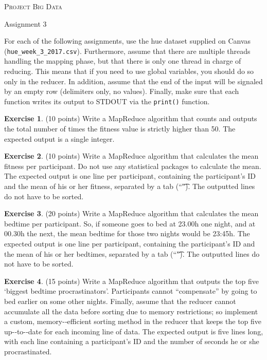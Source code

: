 \documentclass[a4paper]{report}
\theoremstyle{definition}
\newtheorem{exercise}{Exercise}
\newcommand{\blankline}{\par\vspace{5mm}}
\begin{document}
\begin{center}
    \textsc{\Large Project Big Data}
    \blankline
    
    {\large Assignment 3}
\end{center}

For each of the following assignments, use the hue dataset supplied on
Canvas (\texttt{\small hue\_week\_3\_2017.csv}). Furthermore, assume
that there are multiple threads handling the mapping phase, but that
there is only one thread in charge of reducing. This means that if you
need to use global variables, you should do so only in the reducer. In
addition, assume that the end of the input will be signaled by an empty
row (delimiters only, no values). Finally, make sure that each function
writes its output to STDOUT via the \texttt{\small print()} function.

\begin{exercise}
(10 points) Write a MapReduce algorithm that counts and outputs the
total number of times the fitness value is strictly higher than 50. The
expected output is a single integer.
\end{exercise}

\begin{exercise}
(10 points) Write a MapReduce algorithm that calculates the mean fitness
per participant. Do not use any statistical packages to calculate
the mean. The expected output is one line per participant, containing
the participant’s ID and the mean of his or her fitness, separated by
a tab (“\t”). The outputted lines do not have to be sorted.
\end{exercise}

\begin{exercise}
(20 points) Write a MapReduce algorithm that calculates the mean bedtime
per participant. So, if someone goes to bed at 23.00h one night,
and at 00.30h the next, the mean bedtime for those two nights would
be 23:45h. The expected output is one line per participant, containing
the participant’s ID and the mean of his or her bedtimes, separated
by a tab (“\t”). The outputted lines do not have to be sorted.
\end{exercise}

\begin{exercise}
(15 points) Write a MapReduce algorithm that outputs the top
five ‘biggest bedtime procrastinators’. Participants cannot
“compensate” by going to bed earlier on some other nights. Finally,
assume that the reducer cannot accumulate all the data before sorting
due to memory restrictions; so implement a custom, memory-­‐efficient
sorting method in the reducer that keeps the top five up-­‐to-­‐date
for each incoming line of data. The expected output is five lines long,
with each line containing a participant’s ID and the number of seconds
he or she procrastinated.
\end{exercise}
\end{document}
